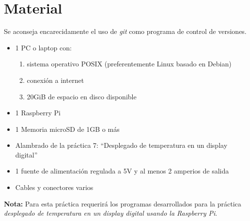 %
%



\section{Material}%
\label{sec:material}
Se aconseja encarecidamente el uso de \textit{git} como programa de control de versiones.

\begin{itemize}[noitemsep]
	\item 1 PC o laptop con:
	\begin{enumerate}[label=\roman*\rpar,noitemsep]
		\item sistema operativo POSIX (preferentemente Linux basado en Debian)
		\item conexión a internet
		\item 20GiB de espacio en disco disponible
	\end{enumerate}
	\item 1 Raspberry Pi
	\item 1 Memoria microSD de 1GB o más
	\item Alambrado de la práctica 7: \enquote{Desplegado de temperatura en un display digital}
	\item 1 fuente de alimentación regulada a 5V y al menos 2 amperios de salida
	\item Cables y conectores varios
\end{itemize}

\noindent\textbf{Nota:}
Para esta práctica requerirá los programas desarrollados para la práctica \emph{desplegado de temperatura en un display digital usando la Raspberry Pi}.
